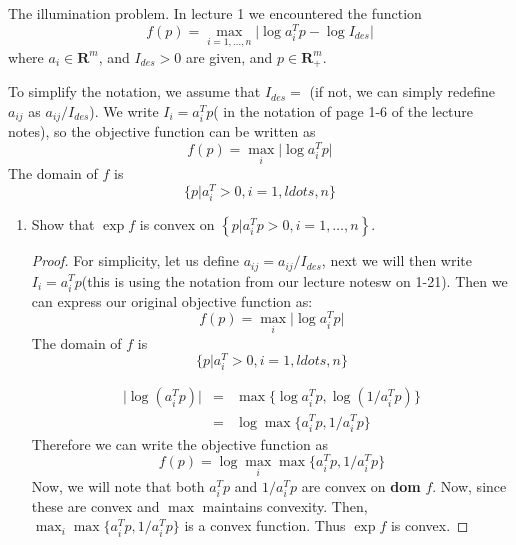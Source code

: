 \begin{prob}[3.3]
  The illumination problem. In lecture 1 we encountered the function
  \[
  f(p) = \max_{i = 1, \ldots, n} \vert \log a_{i}^{T} p - \log I_{des} \vert
  \]
  where $a_{i} \in \mathbf{R}^{m}$, and $I_{des} > 0$ are given, and
  $p \in \mathbf{R}^{m}_{+}$.
\end{prob}
To simplify the notation, we assume that $I_{des} = $ (if not, we can simply redefine
$a_{ij}$ as $a_{ij}/I_{des}$). We write $I_{i} = a^{T}_{i} p$( in the notation of page 1-6 of the
lecture notes), so the objective function can be written as
\[
f(p) = \max_{i} \vert \log a^{T}_{i} p \vert
\]
The domain of $f$ is
\[
\{p \vert a_{i}^{T} > 0, i = 1, ldots, n\}
\]
 \begin{enumerate}[label=(\alph*)]
  \item{Show that $\exp f$ is convex on $\left \{p \vert a_{i}^{T} p > 0, i = 1, \ldots, n \right \}$.
    \begin{proof}
      For simplicity, let us define $a_{ij} = a_{ij}/I_{des}$, next we will then
      write $I_{i} = a^{T}_{i} p$(this is using the notation from our lecture notesw on 1-21). Then we can express our original objective
      function as:
\[
f(p) = \max_{i} \vert \log a^{T}_{i} p \vert
\]
The domain of $f$ is
\[
\{p \vert a_{i}^{T} > 0, i = 1, ldots, n\}
\]

      \begin{eqnarray*}
        \vert \log(a^{T}_{i} p)\vert &=& \max\{\log a^{T}_{i} p, \log(1/a^{T}_{i} p)\}\\
        &=& \log \max \{ a^{T}_{i} p,1/a^{T}_{i} p\}
      \end{eqnarray*}
      Therefore we can write the objective function as
      \[
      f(p) = \log \max_{i} \max \{a^{T}_{i} p, 1/a^{T}_{i} p\}
      \]
      Now, we will note that both $a^{T}_{i} p$ and $1/a^{T}_{i} p$ are convex on \textbf{dom} $f$. Now, since these are convex and $\max$ maintains convexity.
      Then, $\max_{i} \max \{a^{T}_{i} p, 1/a^{T}_{i} p\}$ is a convex function.
      Thus $\exp f$ is convex.
    \end{proof}
    
}
\end{enumerate}

